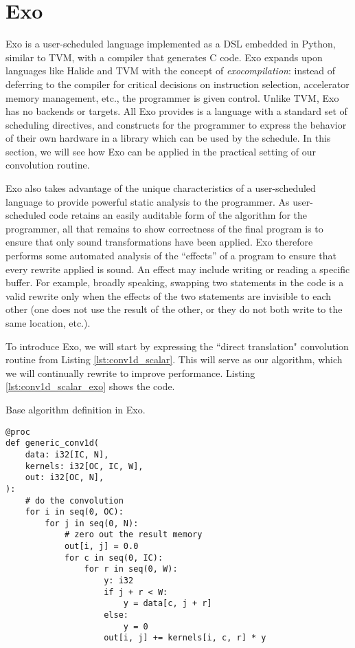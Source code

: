 \documentclass[acmsmall, nonacm=true]{acmart}
\begin{document}
\section{Exo}

Exo \cite{exo} is a user-scheduled language implemented as a DSL embedded in Python, similar to TVM, with a compiler that generates C code. Exo expands upon languages like Halide and TVM with the concept of \textit{exocompilation}: instead of deferring to the compiler for critical decisions on instruction selection, accelerator memory management, etc., the programmer is given control.  Unlike TVM, Exo has no backends or targets. All Exo provides is a language with a standard set of scheduling directives, and constructs for the programmer to express the behavior of their own hardware in a library which can be used by the schedule. In this section, we will see how Exo can be applied in the practical setting of our convolution routine.

Exo also takes advantage of the unique characteristics of a user-scheduled language to provide powerful static analysis to the programmer. As user-scheduled code retains an easily auditable form of the algorithm for the programmer, all that remains to show correctness of the final program is to ensure that only sound transformations have been applied. Exo therefore performs some automated analysis of the ``effects'' of a program to ensure that every rewrite applied is sound. An effect may include writing or reading a specific buffer. For example, broadly speaking, swapping two statements in the code is a valid rewrite only when the effects of the two statements are invisible to each other (one does not use the result of the other, or they do not both write to the same location, etc.).

To introduce Exo, we will start by expressing the ``direct translation" convolution routine from Listing \ref{lst:conv1d_scalar}. This will serve as our algorithm, which we will continually rewrite to improve performance. Listing \ref{lst:conv1d_scalar_exo} shows the code. 

\begin{listing}
\centering
\caption{Base algorithm definition in Exo.}
\begin{verbatim}
@proc
def generic_conv1d(
    data: i32[IC, N],
    kernels: i32[OC, IC, W],
    out: i32[OC, N],
):
    # do the convolution
    for i in seq(0, OC):
        for j in seq(0, N):
            # zero out the result memory
            out[i, j] = 0.0
            for c in seq(0, IC):
                for r in seq(0, W):
                    y: i32
                    if j + r < W:
                        y = data[c, j + r]
                    else:
                        y = 0
                    out[i, j] += kernels[i, c, r] * y
\end{verbatim}
\label{lst:conv1d_scalar_exo}
\end{listing}
\end{document}
